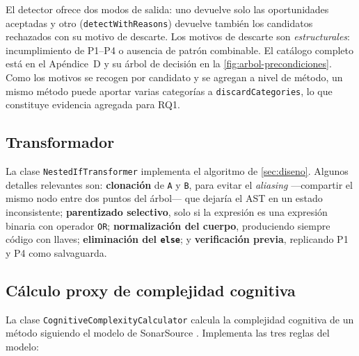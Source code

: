 El detector ofrece dos modos de salida: uno devuelve solo las oportunidades
aceptadas y otro (\lstinline|detectWithReasons|) devuelve también los
candidatos rechazados con su motivo de descarte. Los motivos de descarte son
\emph{estructurales}: incumplimiento de P1--P4 o ausencia de patrón combinable.
El catálogo completo está en el Apéndice~D y su árbol de decisión en la
\autoref{fig:arbol-precondiciones}. Como los motivos se recogen por candidato y se
agregan a nivel de método, un mismo método puede aportar varias categorías
a \lstinline|discardCategories|, lo que constituye evidencia agregada para
RQ1.

\subsection{Transformador}
La clase \texttt{NestedIfTransformer} implementa el algoritmo de
\autoref{sec:diseno}. Algunos detalles relevantes son: \textbf{clonación} de \lstinline|A| y
\lstinline|B|, para evitar el \emph{aliasing} ---compartir el mismo nodo entre
dos puntos del árbol--- que dejaría el AST en un estado inconsistente;
\textbf{parentizado selectivo},
solo si la expresión es una expresión binaria con operador
\lstinline|OR|; \textbf{normalización del cuerpo}, produciendo siempre código con llaves;
\textbf{eliminación del \texttt{else}};
y \textbf{verificación previa}, replicando
P1 y P4 como salvaguarda.

\subsection{Cálculo proxy de complejidad cognitiva}
\label{sec:proxy}
La clase \texttt{Cognitive\allowbreak Complexity\allowbreak Calculator} calcula la complejidad
cognitiva de un método siguiendo el modelo de SonarSource
\cite{10.1145/3194164.3194186}. Implementa las tres reglas del modelo:

